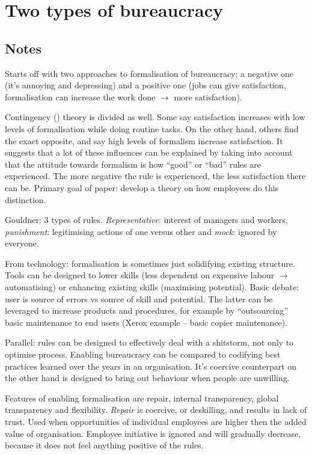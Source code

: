 \chapter{Two types of bureaucracy \cite{adler1996two}}
\section{Notes}
Starts off with two approaches to formalisation of bureaucracy; a negative one (it's annoying and depressing) and a positive one (jobs can give satisfaction, formalisation can increase the work done $\rightarrow$ more satisfaction).

Contingency () theory is divided as well. 
Some say satisfaction increases with low levels of formalisation while doing routine tasks. 
On the other hand, others find the exact opposite, and say high levels of formalism increase satisfaction. 
It suggests that a lot of these influences can be explained by taking into account that the attitude towards formalism is how ``good'' or ``bad'' rules are experienced. 
The more negative the rule is experienced, the less satisfaction there can be.
Primary goal of paper: develop a theory on how employees do this distinction.

Gouldner: 3 types of rules. 
\emph{Representative}: interest of managers and workers, \emph{punishment}: legitimising actions of one versus other and \emph{mock}: ignored by everyone.

From technology: formalisation is sometimes just solidifying existing structure.
Tools can be designed to lower skills (less dependent on expensive labour $\rightarrow$ automatising) or enhancing existing skills (maximising potential).
Basic debate: user is source of errors vs source of skill and potential.
The latter can be leveraged to increase products and procedures, for example by ``outsourcing'' basic maintenance to end users (Xerox example -- basic copier maintenance).

Parallel: rules can be designed to effectively deal with a shitstorm, not only to optimise process. 
Enabling bureaucracy can be compared to codifying best practices learned over the years in an organisation.
It's coercive counterpart on the other hand is designed to bring out behaviour when people are unwilling. 

Features of enabling formalisation are repair, internal transparency, global transparency and flexibility. 
\emph{Repair} is coercive, or deskilling, and results in lack of trust. 
Used when opportunities of individual employees are higher then the added value of organisation. 
Employee initiative is ignored and will gradually decrease, because it does not feel anything positive of the rules. 

